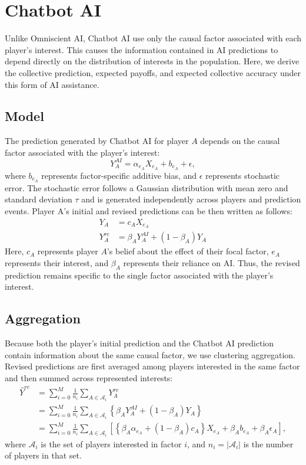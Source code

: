 \documentclass[12pt]{article}
\begin{document}
\section*{Chatbot AI}

Unlike Omniscient AI, Chatbot AI use only the causal factor associated with each player's interest. 
This causes the information contained in AI predictions to depend directly on the distribution of interests in the population. 
Here, we derive the collective prediction, expected payoffs, and expected collective accuracy under this form of AI assistance.

\subsection*{Model}

The prediction generated by Chatbot AI for player $A$ depends on the causal factor associated with the player's interest:
\begin{equation}
Y_A^{AI} = \alpha_{e_A}X_{e_A} + b_{e_A} +\epsilon,
\end{equation}
where $b_{e_A}$ represents factor-specific additive bias, and $\epsilon$ represents stochastic error. 
The stochastic error follows a Gaussian distribution with mean zero and standard deviation $\tau$ and is generated independently across players and prediction events. 
Player A's initial and revised predictions can be then written as follows:
\begin{align}
Y_A &= c_AX_{e_A}\\
Y_A^{re} &= \beta_AY_A^{AI} + (1-\beta_A)Y_A
\end{align}
Here, $c_A$ represents player $A$'s belief about the effect of their focal factor, $e_A$ represents their interest, and $\beta_A$ represents their reliance on AI. 
Thus, the revised prediction remains specific to the single factor associated with the player's interest.

\subsection*{Aggregation}

Because both the player's initial prediction and the Chatbot AI prediction contain information about the same causal factor, we use clustering aggregation. 
Revised predictions are first averaged among players interested in the same factor and then summed across represented interests:
\begin{align}
\hat{Y}^{re}
&= \sum_{i = 0}^{M}\frac{1}{n_i}\sum_{A \in \mathcal{A}_i}Y_A^{re}\\
&= \sum_{i = 0}^{M}\frac{1}{n_i}\sum_{A \in \mathcal{A}_i}\left\{\beta_AY_A^{AI} + (1-\beta_A)Y_A\right\}\\
&= \sum_{i = 0}^{M}\frac{1}{n_i}\sum_{A \in \mathcal{A}_i}\left[\left\{\beta_A\alpha_{e_A} + (1-\beta_A)c_A\right\}X_{e_A} + \beta_Ab_{e_A} + \beta_A\epsilon_A\right],
\end{align}
where $\mathcal{A}_i$ is the set of players interested in factor $i$, and $n_i=|\mathcal{A}_i|$ is the number of players in that set. 
\end{document}
